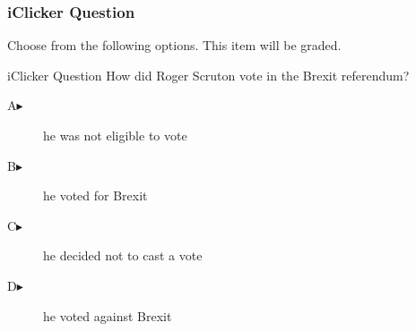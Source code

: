 \begin{frame}
  \frametitle{iClicker Question}
Choose from the following options. This item will be graded.
\begin{block}{iClicker Question}
  How did Roger Scruton vote in the Brexit referendum?
\end{block}
\begin{description}
\item[A\hspace{.2in}$\blacktriangleright$] he was not eligible to vote
\item[B\hspace{.2in}$\blacktriangleright$] he voted for Brexit
\item[C\hspace{.2in}$\blacktriangleright$] he decided not to cast a vote
\item[D\hspace{.2in}$\blacktriangleright$] he voted against Brexit
\end{description}
\end{frame}
